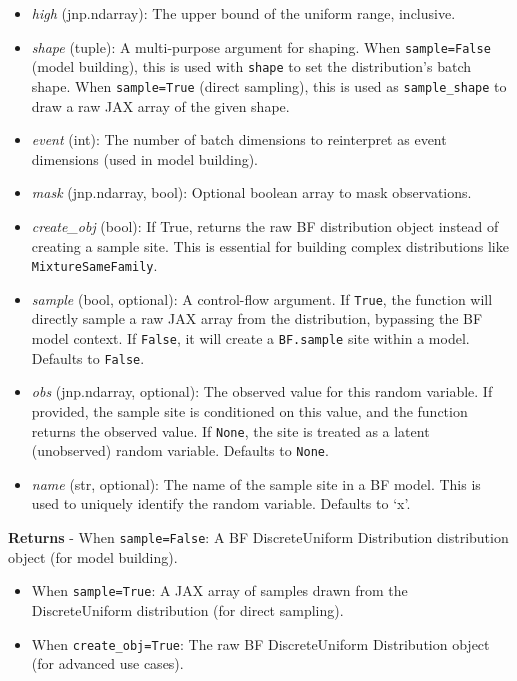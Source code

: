 \documentclass[
  letterpaper,
  DIV=11,
  numbers=noendperiod]{scrartcl}
\begin{document}
\begin{itemize}
\item
  \emph{high} (jnp.ndarray): The upper bound of the uniform range,
  inclusive.
\item
  \emph{shape} (tuple): A multi-purpose argument for shaping. When
  \texttt{sample=False} (model building), this is used with
  \texttt{shape} to set the distribution's batch shape. When
  \texttt{sample=True} (direct sampling), this is used as
  \texttt{sample\_shape} to draw a raw JAX array of the given shape.
\item
  \emph{event} (int): The number of batch dimensions to reinterpret as
  event dimensions (used in model building).
\item
  \emph{mask} (jnp.ndarray, bool): Optional boolean array to mask
  observations.
\item
  \emph{create\_obj} (bool): If True, returns the raw BF distribution
  object instead of creating a sample site. This is essential for
  building complex distributions like \texttt{MixtureSameFamily}.
\item
  \emph{sample} (bool, optional): A control-flow argument. If
  \texttt{True}, the function will directly sample a raw JAX array from
  the distribution, bypassing the BF model context. If \texttt{False},
  it will create a \texttt{BF.sample} site within a model. Defaults to
  \texttt{False}.
\item
  \emph{obs} (jnp.ndarray, optional): The observed value for this random
  variable. If provided, the sample site is conditioned on this value,
  and the function returns the observed value. If \texttt{None}, the
  site is treated as a latent (unobserved) random variable. Defaults to
  \texttt{None}.
\item
  \emph{name} (str, optional): The name of the sample site in a BF
  model. This is used to uniquely identify the random variable. Defaults
  to `x'.
\end{itemize}

\textbf{Returns} - When \texttt{sample=False}: A BF DiscreteUniform
Distribution distribution object (for model building).

\begin{itemize}
\item
  When \texttt{sample=True}: A JAX array of samples drawn from the
  DiscreteUniform distribution (for direct sampling).
\item
  When \texttt{create\_obj=True}: The raw BF DiscreteUniform
  Distribution object (for advanced use cases).
\end{itemize}
\end{document}
